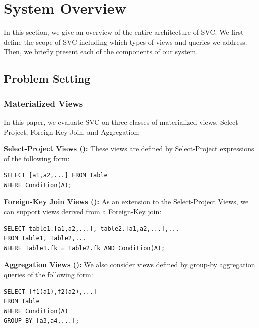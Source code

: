 \section{System Overview}\label{sec-arch}
In this section, we give an overview of the entire architecture of SVC.
We first define the scope of SVC including which types of views and queries we address.
Then, we briefly present each of the components of our system.

\subsection{Problem Setting}
\vspace{-.5em}
\subsubsection{Materialized Views}
In this paper, we evaluate SVC on three classes of materialized views, Select-Project, Foreign-Key Join, and Aggregation:
\vspace{0.25em}

\noindent\textbf{Select-Project Views (\spview): } These views are defined by Select-Project
expressions of the following form:

\begin{lstlisting}
SELECT [a1,a2,...] FROM Table 
WHERE Condition(A);
\end{lstlisting}

\vspace{0.25em}

\noindent\textbf{Foreign-Key Join Views (\fjview): } As an extension to the Select-Project Views, we can support views derived from a Foreign-Key join:

\begin{lstlisting}
SELECT table1.[a1,a2,...], table2.[a1,a2,...],...
FROM Table1, Table2,...
WHERE Table1.fk = Table2.fk AND Condition(A);
\end{lstlisting}

\vspace{0.25em}

\noindent\textbf{Aggregation Views (\aggview): } We also consider views defined by group-by aggregation queries of the following form:

\begin{lstlisting}
SELECT [f1(a1),f2(a2),...] 
FROM Table 
WHERE Condition(A)
GROUP BY [a3,a4,...];
\end{lstlisting}

